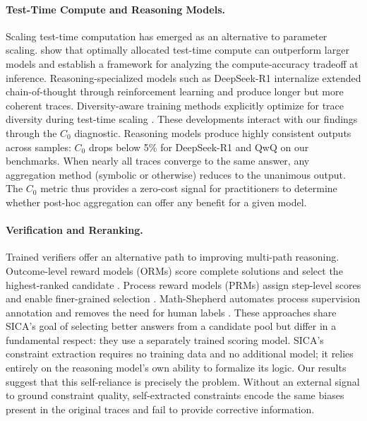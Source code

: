 \paragraph{Test-Time Compute and Reasoning Models.}
Scaling test-time computation has emerged as an alternative to parameter scaling. \citet{snell2025scaling} show that optimally allocated test-time compute can outperform larger models and establish a framework for analyzing the compute-accuracy tradeoff at inference. Reasoning-specialized models such as DeepSeek-R1 \citep{deepseek2025r1} internalize extended chain-of-thought through reinforcement learning and produce longer but more coherent traces. Diversity-aware training methods explicitly optimize for trace diversity during test-time scaling \citep{diverseaware2025}. These developments interact with our findings through the $C_0$ diagnostic. Reasoning models produce highly consistent outputs across samples: $C_0$ drops below 5\% for DeepSeek-R1 and QwQ on our benchmarks. When nearly all traces converge to the same answer, any aggregation method (symbolic or otherwise) reduces to the unanimous output. The $C_0$ metric thus provides a zero-cost signal for practitioners to determine whether post-hoc aggregation can offer any benefit for a given model.

\paragraph{Verification and Reranking.}
Trained verifiers offer an alternative path to improving multi-path reasoning. Outcome-level reward models (ORMs) score complete solutions and select the highest-ranked candidate \citep{cobbe2021gsm8k}. Process reward models (PRMs) assign step-level scores and enable finer-grained selection \citep{lightman2023prm}. Math-Shepherd automates process supervision annotation and removes the need for human labels \citep{wang2024mathshepherd}. These approaches share SICA's goal of selecting better answers from a candidate pool but differ in a fundamental respect: they use a separately trained scoring model. SICA's constraint extraction requires no training data and no additional model; it relies entirely on the reasoning model's own ability to formalize its logic. Our results suggest that this self-reliance is precisely the problem. Without an external signal to ground constraint quality, self-extracted constraints encode the same biases present in the original traces and fail to provide corrective information.


